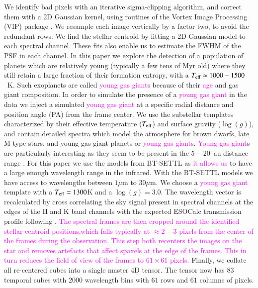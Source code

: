 \documentclass[referee]{aa} %
\newcommand{\newchange}[1]{\textcolor{magenta}{#1}}
\begin{document}
We identify bad pixels with an iterative sigma-clipping algorithm, and correct them with a 2D Gaussian kernel, using routines of the Vortex Image Processing (\textsc{VIP}) package \citep{2017AJGomezVIP,2023Christiaens}.
We resample each image vertically by a factor two, to avoid the redundant rows. 
We find the stellar centroid by fitting a 2D Gaussian model to each spectral channel. 
These fits also enable us to estimate the FWHM of the PSF in each channel. 
In this paper we explore the detection of a population of planets which are relatively young (typically a few tens of Myr old) where they still retain a large fraction of their formation entropy, with a $T_{\rm eff}\approx 1000 - 1500$~K.
Such exoplanets are called \newchange{young gas giant}s because of their \newchange{age} and gas giant composition.
In order to simulate the presence of a \newchange{young gas giant} in the data we inject a simulated \newchange{young gas giant} at a specific radial distance and position angle (PA) from the frame center.
We use the substellar templates characterized by their effective temperature ($T_{\rm{eff}}$) and surface gravity ($\log(g)$), and contain detailed spectra which model the atmosphere for brown dwarfs, late M-type stars, and young gas-giant planets or \newchange{young gas giant}s.
\newchange{Young gas giant}s are particularly interesting as they seem to be present in the $5-20$~au distance range \cite{2016Bryan}.
For this paper we use the models from BT-SETTL as \newchange{it allows us} to have a large enough wavelength range in the infrared. 
With the BT-SETTL models we have access to wavelengths between $1\mu$m to $30\mu$m.
We choose a \newchange{young gas giant} template with a $T_{\rm eff} = 1300$K and a $\log(g)=3.0$.
The wavelength vector is recalculated by cross correlating the sky signal present in spectral channels at the edges of the H and K band channels with the expected ESOCalc transmission profile following \cite{2018AHoeijmakersMM}. 
\newchange{The spectral frames are then cropped around the identified stellar centroid positions,which falls typically at $\approx 2-3$ pixels from the center of the frames during the observation. This step both recenters the images on the star and removes artefacts that affect spaxels at the edge of the frames.
This in turn reduces the field of view of the frames to $61\times61$ pixels.}
Finally, we collate all re-centered cubes into a single master 4D tensor.
The tensor now has $83$ temporal cubes with $2000$ wavelength bins with $61$ rows and $61$ columns of pixels.
\end{document}
